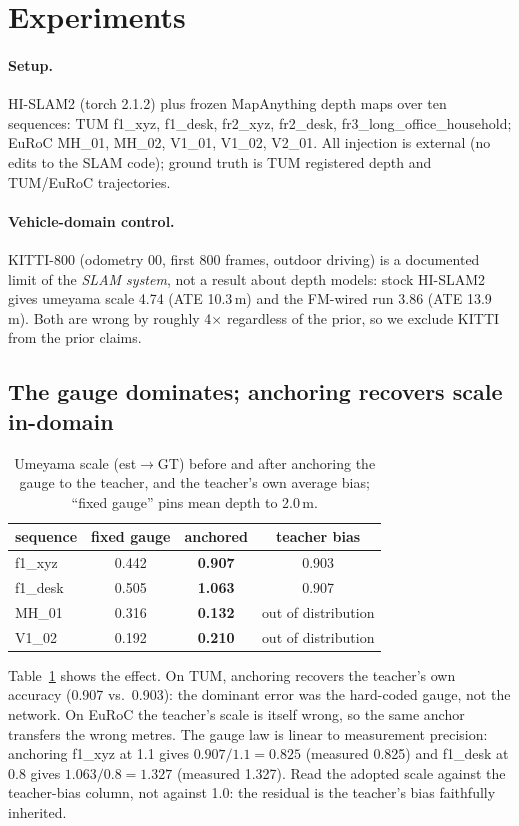 \section{Experiments}

\paragraph{Setup.} HI-SLAM2 (torch 2.1.2) plus frozen MapAnything depth maps over
ten sequences: TUM f1\_xyz, f1\_desk, fr2\_xyz, fr2\_desk,
fr3\_long\_office\_household; EuRoC MH\_01, MH\_02, V1\_01, V1\_02, V2\_01. All
injection is external (no edits to the SLAM code); ground truth is TUM registered
depth and TUM/EuRoC trajectories.

\paragraph{Vehicle-domain control.} KITTI-800 (odometry 00, first 800 frames,
outdoor driving) is a documented limit of the \emph{SLAM system}, not a result
about depth models: stock HI-SLAM2 gives umeyama scale 4.74 (ATE 10.3\,m) and the
FM-wired run 3.86 (ATE 13.9\,m). Both are wrong by roughly 4$\times$ regardless
of the prior, so we exclude KITTI from the prior claims.

\subsection{The gauge dominates; anchoring recovers scale in-domain}

\begin{table}[t]
\centering
\caption{Umeyama scale (est$\to$GT) before and after anchoring the gauge to the
teacher, and the teacher's own average bias; ``fixed gauge'' pins mean depth to
2.0\,m.}
\label{tab:indomain}
\small
\begin{tabular}{@{}lccc@{}}
\toprule
sequence & fixed gauge & anchored & teacher bias \\
\midrule
f1\_xyz & 0.442 & \textbf{0.907} & 0.903 \\
f1\_desk & 0.505 & \textbf{1.063} & 0.907 \\
MH\_01 & 0.316 & \textbf{0.132} & out of distribution \\
V1\_02 & 0.192 & \textbf{0.210} & out of distribution \\
\bottomrule
\end{tabular}
\end{table}

Table~\ref{tab:indomain} shows the effect. On TUM, anchoring recovers the teacher's own accuracy (0.907 vs.\ 0.903): the
dominant error was the hard-coded gauge, not the network. On EuRoC the teacher's
scale is itself wrong, so the same anchor transfers the wrong metres. The gauge
law is linear to measurement precision: anchoring f1\_xyz at 1.1 gives
$0.907/1.1=0.825$ (measured 0.825) and f1\_desk at 0.8 gives $1.063/0.8=1.327$
(measured 1.327). Read the adopted scale against the teacher-bias column, not
against 1.0: the residual is the teacher's bias faithfully inherited.

